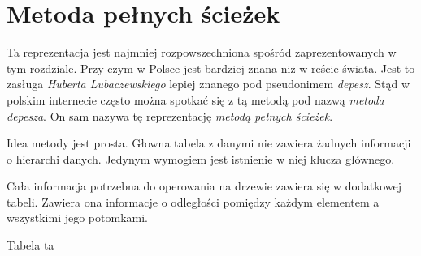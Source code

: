 \section{Metoda pełnych ścieżek}
% 




Ta reprezentacja jest najmniej rozpowszechniona spośród zaprezentowanych w tym rozdziale.
Przy czym w Polsce jest bardziej znana niż w reście świata.
Jest to zasługa \emph{Huberta Lubaczewskiego} lepiej znanego pod pseudonimem \emph{depesz}.
Stąd w polskim internecie często można spotkać się z tą metodą pod nazwą \emph{metoda depesza}.
On sam nazywa tę reprezentację \emph{metodą pełnych ścieżek}.




Idea metody jest prosta. 
Głowna tabela z danymi nie zawiera żadnych informacji o hierarchi danych. 
Jedynym wymogiem jest istnienie w niej klucza głównego.

Cała informacja potrzebna do operowania na drzewie zawiera się w dodatkowej tabeli. 
Zawiera ona informacje o odległości pomiędzy każdym elementem a wszystkimi jego potomkami.

Tabela ta 


